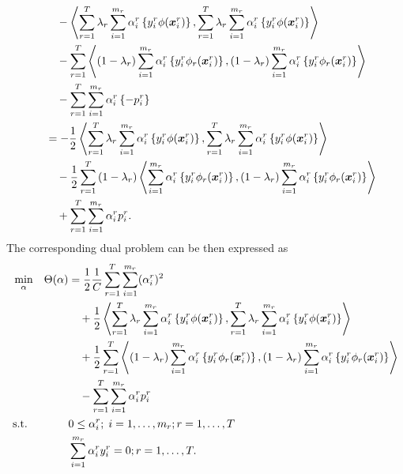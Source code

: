 \begin{equation}
\begin{aligned}
        &\qquad - \left\langle  \sum_{r= 1}^T \lambda_r \sum_{i=1}^{m_r} {\alpha_i^r} \left\lbrace y_i^r \phi(\bm{x}_i^r) \right\rbrace,  \sum_{r= 1}^T \lambda_r \sum_{i=1}^{m_r} {\alpha_i^r} \left\lbrace y_i^r \phi(\bm{x}_i^r) \right\rbrace \right\rangle \\
        &\qquad -  \sum_{r= 1}^T {\left\langle (1-\lambda_r) \sum_{i=1}^{m_r} {\alpha_i^r} \left\lbrace y_i^r \phi_r(\bm{x}_i^r) \right\rbrace, (1-\lambda_r) \sum_{i=1}^{m_r} {\alpha_i^r} \left\lbrace y_i^r \phi_r(\bm{x}_i^r) \right\rbrace \right\rangle} \\
        &\qquad -  \sum_{r= 1}^T \sum_{i=1}^{m_r} \alpha_i^r \left\lbrace - p_{i}^r  \right\rbrace \\
        &\quad= - \frac{1}{2} \left\langle  \sum_{r= 1}^T  \lambda_r \sum_{i=1}^{m_r} {\alpha_i^r} \left\lbrace y_i^r \phi(\bm{x}_i^r) \right\rbrace,  \sum_{r= 1}^T \lambda_r \sum_{i=1}^{m_r} {\alpha_i^r} \left\lbrace y_i^r \phi(\bm{x}_i^r) \right\rbrace \right\rangle \\
        &\qquad - \frac{1}{2} \sum_{r= 1}^T {(1-\lambda_r) \left\langle \sum_{i=1}^{m_r} {\alpha_i^r} \left\lbrace y_i^r \phi_r(\bm{x}_i^r) \right\rbrace, (1-\lambda_r) \sum_{i=1}^{m_r} {\alpha_i^r} \left\lbrace y_i^r \phi_r(\bm{x}_i^r) \right\rbrace \right\rangle} \\
        &\qquad +  \sum_{r= 1}^T \sum_{i=1}^{m_r} \alpha_i^r  p_{i}^r .
    \end{aligned}
\end{equation}
The corresponding dual problem can be then expressed as
\begin{equation}\label{eq:svmmtl_dual_conv_l2}
    \begin{aligned}
    & \min_{\alpha} & \Theta(\alpha) &= \frac{1}{2} \frac{1}{C} \sum_{r=1}^\ntasks \sum_{i=1}^{\npertask_r} (\alpha_i^r)^2 \\
    & & &\quad+\frac{1}{2} \dotp{\sum_{r= 1}^\ntasks \lambda_r \sum_{i=1}^{m_r} {\alpha_i^r} \left\lbrace y_i^r \phi(\fv{x}_i^r) \right\rbrace}{\sum_{r= 1}^\ntasks \lambda_r \sum_{i=1}^{m_r} {\alpha_i^r} \left\lbrace y_i^r \phi(\fv{x}_i^r) \right\rbrace} \\
    & & &\quad+  \frac{1}{2} \sum_{r= 1}^T {\dotp{(1 - \lambda_r)\sum_{i=1}^{m_r} {\alpha_i^r} \left\lbrace y_i^r \phi_r(\fv{x}_i^r) \right\rbrace}{(1 - \lambda_r) \sum_{i=1}^{m_r} {\alpha_i^r} \left\lbrace y_i^r \phi_r(\fv{x}_i^r) \right\rbrace}} \\
    & & &\quad - \sum_{r=1}^\ntasks \sum_{i=1}^{\npertask_r} \alpha_i^r p_i^r \\
    & \text{s.t.}
    & & 0 \leq \alpha_i^r ; \; i=1, \ldots, m_r; r=1, \ldots, \ntasks \\
    & & & \sum_{i=1}^{m_r} \alpha_i^r y_i^r = 0;  r=1, \ldots, \ntasks . \\
    \end{aligned}
\end{equation}

